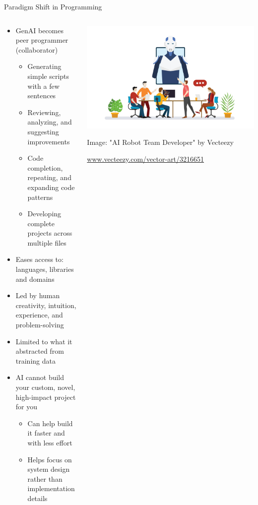 \documentclass[xcolor=dvipsnames, aspectratio=169]{beamer}
\begin{document}
\begin{frame}{Paradigm Shift in Programming}
  \begin{columns}
    \begin{column}{0.6\textwidth}
      \begin{itemize}
        \item GenAI becomes peer programmer (collaborator)
          \begin{itemize}
            \item Generating simple scripts with a few sentences
            \item Reviewing, analyzing, and suggesting improvements
            \item Code completion, repeating, and expanding code patterns
            \item Developing complete projects across multiple files
          \end{itemize}
        \item Eases access to: languages, libraries and domains
        \item Led by human creativity, intuition, experience, and problem-solving
        \item Limited to what it abstracted from training data
        \item AI cannot build your custom, novel, high-impact project for you
        \begin{itemize}
            \item Can help build it faster and with less effort
            \item Helps focus on system design rather than implementation details
          \end{itemize}
      \end{itemize}
    
    \end{column}
    
    \begin{column}{0.4\textwidth}
      \includegraphics[width=\textwidth]{images/376_generated.jpg}
      \tiny\centerline{Image: "AI Robot Team Developer" by Vecteezy}
      \tiny\centerline{\url{www.vecteezy.com/vector-art/3216651}}
    \end{column}
  \end{columns}
\end{frame}
\end{document}
